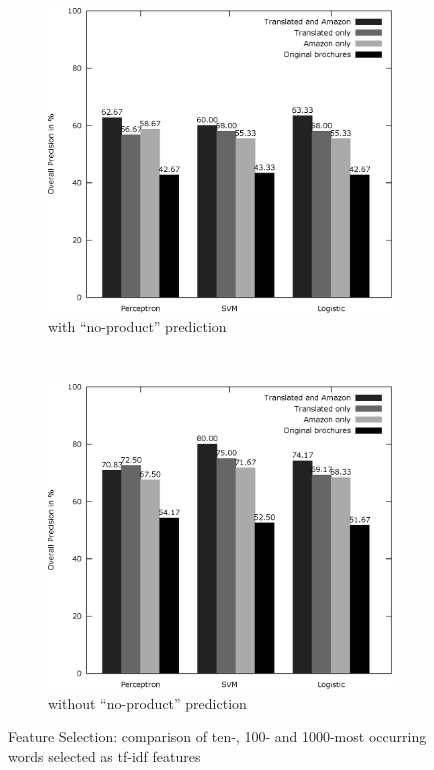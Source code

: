 \begin{figure}[h!]
	\centering
	\begin{subfigure}[t]{0.5\textwidth}
		\includegraphics[width=\textwidth]{figures/product_translate_amazon_with_none.eps}
		\caption{with ``no-product'' prediction}
	\end{subfigure}~
	\begin{subfigure}[t]{0.5\textwidth}
		\includegraphics[width=\textwidth]{figures/product_translate_amazon_without_none.eps}
		\caption{without ``no-product'' prediction}
	\end{subfigure}
	\caption{Feature Selection: comparison of ten-, 100- and 1000-most occurring words selected as tf-idf features}
	\label{fig:product_translate_amazon}
\end{figure}

